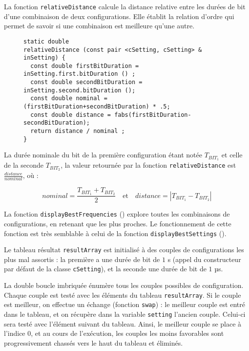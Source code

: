 La fonction \texttt{relativeDistance} calcule la distance relative entre les durées de bit d'une combinaison de deux configurations. Elle établit la relation d'ordre qui permet de savoir si une combinaison est meilleure qu'une autre.

\begin{figure}[!ht]
\begin{lstlisting}
static double
relativeDistance (const pair <cSetting, cSetting> & inSetting) {
  const double firstBitDuration = inSetting.first.bitDuration () ;
  const double secondBitDuration = inSetting.second.bitDuration ();
  const double nominal = (firstBitDuration+secondBitDuration) * .5;
  const double distance = fabs(firstBitDuration-secondBitDuration);
  return distance / nominal ;
}
\end{lstlisting}
\end{figure}

La durée nominale du bit de la première configuration étant notée $T_{BIT_1}$ et celle de la seconde $T_{BIT_2}$, la valeur retournée par la fonction \texttt{relativeDistance} est $\displaystyle\frac{distance}{nominal}$, où :

\begin{equation*}
  nominal = \frac{T_{BIT_1} + T_{BIT_2}}{2}\text{~~~et~~~}distance = |T_{BIT_1} - T_{BIT_2}|
\end{equation*}


La fonction \texttt{displayBestFrequencies} () explore toutes les combinaisons de configurations, en retenant que les plus proches. Le fonctionnement de cette fonction est très semblable à celui de la fonction \texttt{displayBestSettings} ().

Le tableau résultat \texttt{resultArray} est initialisé à des couples de configurations les plus mal assortis : la première a une durée de bit de $1$ s (appel du constructeur par défaut de la classe \texttt{cSetting}), et la seconde une durée de bit de $1$ µs.

La double boucle imbriquée énumère tous les couples possibles de configuration. Chaque couple est testé avec les éléments du tableau \texttt{resultArray}. Si le couple est meilleur, on effectue un échange (fonction \texttt{swap}) : le meilleur couple est entré dans le tableau, et on récupère dans la variable \texttt{setting} l'ancien couple. Celui-ci sera testé avec l'élément suivant du tableau. Ainsi, le meilleur couple se place à l'indice $0$, et au cours de l'exécution, les couples les moins favorables sont progressivement chassés vers le haut du tableau et éliminés.


